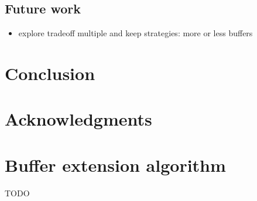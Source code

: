 \documentclass[conference]{IEEEtran}
\begin{document}
\subsection{Future work}
\begin{itemize}
  \item explore tradeoff multiple and keep strategies: more or less buffers
\end{itemize}


\section{Conclusion}

\section{Acknowledgments}




\appendices

\section{Buffer extension algorithm}
\label{bufferExtensionAlgorithm}
TODO
\end{document}
